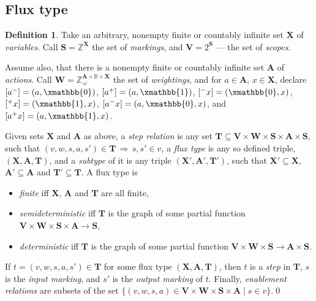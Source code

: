 \documentclass [a4paper,12pt] {article}
\theoremstyle{definition}
\newtheorem{definition}{Definition}[section]
\begin{document}
\subsection {Flux type}

\begin {definition}\label {def:flux-type}
Take an arbitrary, nonempty finite or countably infinite set $\mathbf
{X}$ of {\em variables}\/.  Call $\mathbf {S} = \mathbb {Z}^\mathbf
{X}$ the set of {\em markings}\/, and $\mathbf {V} = 2^{\mathbf {S}}$
--- the set of {\em scopes}\/.

Assume also, that there is a nonempty finite or countably infinite set
$\mathbf {A}$ of {\em actions}\/.  Call $\mathbf {W} = \mathbb
{Z}_{\,\omega}^{\mathbf {A}{\times}\mathbb {B}{\times}\mathbf {X}}$
the set of {\em weightings}\/, and for $a \in \mathbf {A}$, $x \in
\mathbf {X}$, declare $[a^-] = (a, \xmathbb {0})$, $[a^+] = (a,
\xmathbb {1})$, $[{}^-x] = (\xmathbb {0}, x)$, $[{}^+x] = (\xmathbb
         {1}, x)$, $[a^-x] = (a, \xmathbb {0}, x)$, and $[a^+x] = (a,
         \xmathbb {1}, x)$.

Given sets $\mathbf {X}$ and $\mathbf {A}$ as above, a {\em step
  relation}\/ is any set $\mathbf {T} \subseteq \mathbf
{V}{\times}\mathbf {W}{\times}\mathbf {S}{\times}\mathbf
{A}{\times}\mathbf {S}$, such that $(v, w, s, a, s') \in \mathbf {T}
\,\Longrightarrow\, s,s' \in v$, a {\em flux type}\/ is any so defined
triple, $(\mathbf {X}, \mathbf {A}, \mathbf {T})$, and a {\em
  subtype}\/ of it is any triple $(\mathbf {X'}, \mathbf {A'}, \mathbf
{T'})$, such that $\mathbf {X'} \subseteq \mathbf {X}$, $\mathbf {A'}
\subseteq \mathbf {A}$ and $\mathbf {T'} \subseteq \mathbf {T}$.  A
flux type is
%
\begin {itemize}
\item {\em finite}\/ iff $\mathbf {X}$, $\mathbf {A}$ and $\mathbf
  {T}$ are all finite,
\item {\em semideterministic}\/ iff $\mathbf {T}$ is the graph of some
  partial function $\mathbf {V}{\times}\mathbf {W}{\times}\mathbf
  {S}{\times}\mathbf {A} \rightarrow \mathbf {S}$,
\item {\em deterministic}\/ iff $\mathbf {T}$ is the graph of some
  partial function $\mathbf {V}{\times}\mathbf {W}{\times}\mathbf
  {S} \rightarrow \mathbf {A}{\times}\mathbf {S}$.
\end {itemize}
%
If $t = (v, w, s, a, s') \in \mathbf {T}$ for some flux type $(\mathbf
{X}, \mathbf {A}, \mathbf {T})$, then $t$ is a {\em step}\/ in
$\mathbf {T}$, $s$ is the {\em input marking}\/, and $s'$ is the {\em
  output marking}\/ of $t$.  Finally, {\em enablement relations}\/ are
subsets of the set $\{ (v, w, s, a) \in \mathbf {V}{\times}\mathbf
{W}{\times}\mathbf {S}{\times}\mathbf {A} \;|\; s \in v \}$.\qed
\end {definition}
\end{document}
